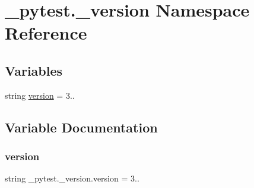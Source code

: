 \hypertarget{namespace__pytest_1_1__version}{}\section{\+\_\+pytest.\+\_\+version Namespace Reference}
\label{namespace__pytest_1_1__version}
\subsection*{Variables}
\begin{DoxyCompactItemize}
\item 
string \hyperlink{namespace__pytest_1_1__version_ac17e4d12c022d395feea4b2a8a9d7416}{version} = \textquotesingle{}3..\textquotesingle{}
\end{DoxyCompactItemize}


\subsection{Variable Documentation}
\mbox{\label{namespace__pytest_1_1__version_ac17e4d12c022d395feea4b2a8a9d7416}} 
\subsubsection{\texorpdfstring{version}{version}}
{\footnotesize\ttfamily string \+\_\+pytest.\+\_\+version.\+version = \textquotesingle{}3..\textquotesingle{}}

